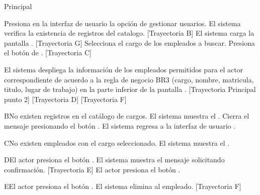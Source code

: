 \begin{UCtrayectoria}{Principal}
    
    \UCpaso[\UCactor] Presiona en la interfaz de usuario  la opción de gestionar usuarios. 
    \UCpaso  El sistema verifica la existencia de registros del catalogo. [Trayectoria B] 
    \UCpaso El sistema carga la pantalla  . [Trayectoria G] 
    \UCpaso[\UCactor] Selecciona el cargo de los empleados a buscar. 
    \UCpaso[\UCactor]  Presiona el botón de .  [Trayectoria C] 
    
    \UCpaso El sistema despliega la información de los empleados permitidos para el actor correspondiente de acuerdo a la regla de negocio BR3 (cargo, nombre, matricula, titulo, lugar de trabajo) en la parte inferior de la pantalla . [Trayectoria Principal punto 2] [Trayectoria D] [Trayectoria F] 
\end{UCtrayectoria}

\begin{UCtrayectoriaA}{B}{No existen registros en el catálogo de cargos.}
    \UCpaso     El sistema muestra el .
    \UCpaso[\UCactor] Cierra el mensaje presionando el botón .
    \UCpaso El sistema regresa a la interfaz de usuario .
\end{UCtrayectoriaA}

\begin{UCtrayectoriaA}{C}{No existen  empleados con el cargo seleccionado.}
    \UCpaso     El sistema muestra el .
\end{UCtrayectoriaA}


\begin{UCtrayectoriaA}{D}{El actor presiona el botón .}
    \UCpaso El sistema muestra el mensaje  solicitando confirmación. [Trayectoria E]
    \UCpaso[\UCactor] El actor presiona el botón .
\end{UCtrayectoriaA}

\begin{UCtrayectoriaA}{E}{El actor presiona el botón .}
    \UCpaso     El sistema elimina al empleado. [Trayectoria F]   
\end{UCtrayectoriaA}

